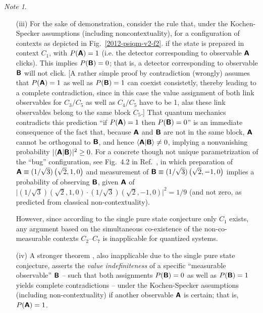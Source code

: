 \documentclass[%
  preprint,
 showpacs,
 showkeys,
 preprintnumbers,
 amsmath,amssymb,
 aps,
 prl,
  longbibliography,
 ]{revtex4-1}
\theoremstyle{definition}
\theoremstyle{remark}
\newtheorem*{note}{Note}
\begin{document}
\begin{note}
\begin{itemize}
\item[(iii)]
For the sake of demonstration, consider the rule that, under the Kochen-Specker assumptions
(including noncontextuality), for a configuration
of contexts as depicted in Fig.~\ref{2012-psiqm-v2-f2}.
if the state is prepared in context $C_1$, with $P(\textsf{\textbf{A}})=1$
(i.e. the detector corresponding to observable $\textsf{\textbf{A}}$ clicks).
This implies $P(\textsf{\textbf{B}})=0$; that is,
a detector corresponding to observable $\textsf{\textbf{B}}$ will not click.
[A rather simple proof by contradiction (wrongly) assumes that $P(\textsf{\textbf{A}})=1$
as well as $P(\textsf{\textbf{B}})=1$
can coexist consistetly, thereby leading to a complete contradiction, since in this case
the value assignment of both link observables for $C_3/C_5$ as well as $C_4/C_5$ have to be  1,
alas these link observables belong to the same block $C_5$.]
That quantum mechanics contradicts this prediction  ``if $P(\textsf{\textbf{A}})=1$ then
$P(\textsf{\textbf{B}})=0$'' is an immediate consequence of the fact that,
because $\textsf{\textbf{A}}$ and $\textsf{\textbf{B}}$ are not in the same block, $\textsf{\textbf{A}}$ cannot be orthogonal to $\textsf{\textbf{B}}$,
and hence
$\langle \textsf{\textbf{A}} \vert \textsf{\textbf{B}} \rangle \neq 0$,
implying a nonvanishing probability $\vert \langle \textsf{\textbf{A}} \vert \textsf{\textbf{B}} \rangle  \vert^2 \ge 0$.
For a concrete though not unique parametrization of the ``bug'' configuration, see
Fig.~4.2 in Ref.~\cite{svozil-tkadlec}, in which preparation of
$\textsf{\textbf{A}}\equiv (1/\sqrt{3})\left(\sqrt{2},1,0\right)$ and measurement of
$\textsf{\textbf{B}}\equiv (1/\sqrt{3})\left(\sqrt{2},-1,0\right)$ implies
a probability of observing  $\textsf{\textbf{B}}$, given $\textsf{\textbf{A}}$
of
$\vert (1/\sqrt{3})\left(\sqrt{2},1,0\right) \cdot (1/\sqrt{3})\left(\sqrt{2},-1,0\right)\vert^2 = 1/9$
(and not zero, as predicted from classical non-contextuality).

However, since according to  the  single pure state conjecture
only $C_1$ exists, any argument based on the simultaneous co-existence of the
non-co-measurable contexts $C_2$--$C_7$ is inapplicable for quantized systems.

\item[(iv)]
A stronger theorem  \cite[Corollary 2]{2012-incomput-proofsCJ},
also inapplicable due to the single pure state conjecture,
asserts the {\em value indefiniteness} of a specific ``measurable observable''  $\textsf{\textbf{B}}$
-- such that both assignments
 $P(\textsf{\textbf{B}})=0$
as well as
 $P(\textsf{\textbf{B}})=1$
yields complete contradictions
--
under the Kochen-Specker assumptions (including non-contextuality)
if another observable $\textsf{\textbf{A}}$ is certain; that is, $P(\textsf{\textbf{A}})=1$.


\end{itemize}
\end{note}
\end{document}
